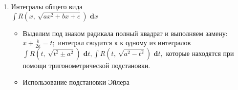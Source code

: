 \documentclass[a4paper,12pt]{bookest}
\theoremstyle{remark}
\newcommand\dx{\textbf{ d}x}
\newcommand\dy{\textbf{ d}}
\begin{document}
\begin{enumerate}
\begin{enumerate}
\begin{example}
	\end{example}
	\begin{example}
		$\int\frac{x+4}{\sqrt{6-2x-x^2}}\dx=\left|\begin{array}{l}
			6-2x-x^2=-((x^2+2x+1)-7)=-(x+1)^2+7=\\=7-(x+1)^2=(\sqrt7)^2-(x+1)^2
		\end{array}\right|=\\=|x+1=t|=\int\frac{t+3}{\sqrt{(\sqrt7)^2+(t^2)}}\dy t=\int\frac{t\dy t}{\sqrt{7-t^2}}+3\int\frac{\dy t}{\sqrt{7-t^2}}=-\frac12\int\frac{\dy(7-t^2)}{\sqrt{7-t^2}}+\\+3\arcsin\frac t{\sqrt{7}}=-\sqrt{7-t^2}+3\arcsin\frac t{\sqrt7}+c=-\sqrt{6-2x-x^2}+\\+3\arcsin\frac{x+1}{\sqrt7}+c$
	\end{example}
	\begin{example}
		$\int\frac{x^2\dx}{\sqrt{1-2x-x^2}}=(Ax+B)\sqrt{1-2x-x^2}+\lambda\left.\int\frac{\dx}{\sqrt{1-2x-x^2}}\right|'=\frac{x^2}{\sqrt{1-2x-x^2}}=\\=A\sqrt{1-2x-x^2}+(Ax+B)\cdot\frac{-2-2}{2\sqrt{1-2x-x^2}}+\left.\frac{\lambda}{\sqrt{1-2x-x^2}}\right|\cdot\sqrt{1-2x-x^2}\\x^2=A-2Ax-Ax^2-Ax^2-Ax-Bx-B+\lambda\\\begin{cases}
			-2A=1\\-3A+B=0\\A-B+\lambda=0
		\end{cases}\begin{cases}
			A=-\frac12\\B=\frac32\lambda=2
		\end{cases}\\\underbrace{\left(-\frac12x+\frac32\right)\sqrt{1-2x-x^2}}_{F(x)}+2\int\frac{\dx}{\sqrt{2-(x+1)^2}}=F(x)+2\arcsin\frac{x+1}{\sqrt2}+c$
	\end{example}
	\end{enumerate}
	\item Интегралы общего вида \\ $\int R(x,\>\sqrt{ax^2+bx+c})\dx$
		\begin{itemize}
			\item [Способ 1] Выделим под знаком радикала полный квадрат и выполняем замену: $x+\frac b{2a}=t;$ интеграл сводится к к одному из интегралов \\$\int R(t,\>\sqrt{t^2\pm a^2})\dy t,\int R(t,\>\sqrt{a^2-t^2})\dy t,$ которые находятся при помощи тригонометрической подстановки.\newpage
			\item [Способ 2] Использование подстановки Эйлера 

\end{itemize}
\end{enumerate}
\end{document}

